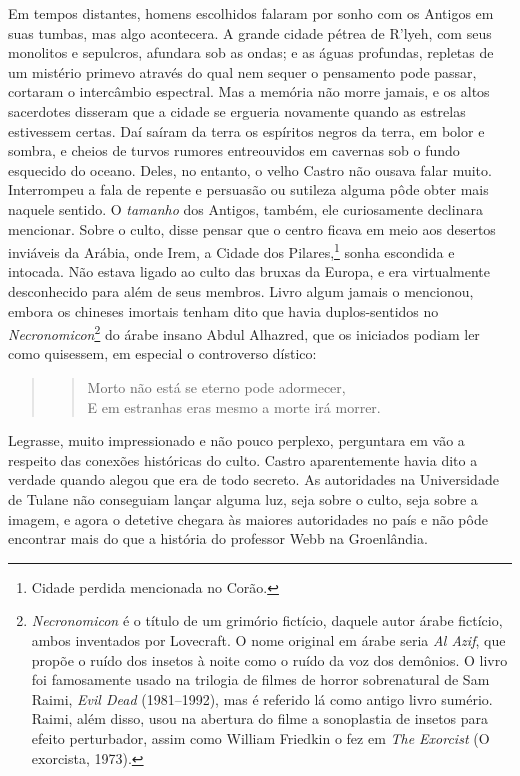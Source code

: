 Em tempos distantes, homens escolhidos falaram por sonho com os Antigos
em suas tumbas, mas algo acontecera. A grande cidade pétrea de R'lyeh,
com seus monolitos e sepulcros, afundara sob as ondas; e as águas
profundas, repletas de um mistério primevo através do qual nem sequer o
pensamento pode passar, cortaram o intercâmbio espectral. Mas a memória
não morre jamais, e os altos sacerdotes disseram que a cidade se
ergueria novamente quando as estrelas estivessem certas. Daí saíram da
terra os espíritos negros da terra, em bolor e sombra, e cheios de
turvos rumores entreouvidos em cavernas sob o fundo esquecido do oceano.
Deles, no entanto, o velho Castro não ousava falar muito. Interrompeu a fala
de repente e persuasão ou sutileza alguma pôde obter mais naquele
sentido. O \emph{tamanho} dos Antigos, também, ele curiosamente
declinara mencionar. Sobre o culto, disse pensar que o centro ficava em
meio aos desertos inviáveis da Arábia, onde Irem, a Cidade dos
Pilares,\footnote{Cidade perdida mencionada no Corão.} sonha escondida e
intocada. Não estava ligado ao culto das bruxas da Europa, e era
virtualmente desconhecido para além de seus membros. Livro algum jamais
o mencionou, embora os chineses imortais tenham dito que havia
duplos-sentidos no \emph{Necronomicon}\footnote{\emph{Necronomicon} é o
  título de um grimório fictício, daquele autor árabe fictício, ambos
  inventados por Lovecraft. O nome original em árabe seria \emph{Al
  Azif}, que propõe o ruído dos insetos à noite como o ruído da
  voz dos demônios. O livro foi famosamente usado na trilogia de
  filmes de horror sobrenatural de Sam Raimi, \emph{Evil Dead}
  (1981--1992), mas é referido lá como antigo livro sumério. Raimi, além
  disso, usou na abertura do filme a sonoplastia de insetos para efeito
  perturbador, assim como William Friedkin o fez em \emph{The Exorcist}
  (O exorcista, 1973).} do árabe insano Abdul Alhazred, que os iniciados podiam ler
como quisessem, em especial o controverso dístico:
\begin{quote}
\begin{verse}
Morto não está se eterno pode adormecer,\\
E em estranhas eras mesmo a morte irá morrer.
\end{verse}
\end{quote}

Legrasse, muito impressionado e não pouco perplexo, perguntara em vão a
respeito das conexões históricas do culto. Castro aparentemente havia
dito a verdade quando alegou que era de todo secreto. As autoridades na
Universidade de Tulane não conseguiam lançar alguma luz, seja sobre o
culto, seja sobre a imagem, e agora o detetive chegara às maiores
autoridades no país e não pôde encontrar mais do que a história do
professor Webb na Groenlândia.

